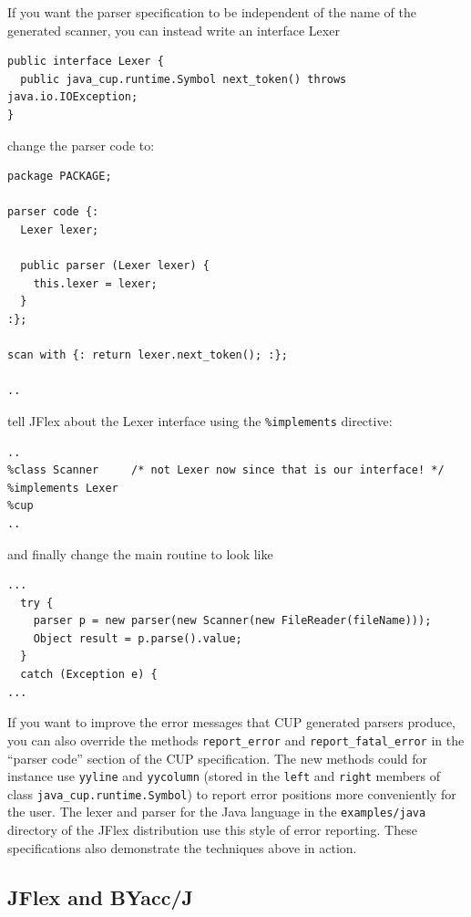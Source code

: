 \documentclass[11pt]{scrartcl}
\newcommand{\xsmall}{}
\begin{document}
If you want the parser specification to be independent of the name of the generated
scanner, you can instead write an interface Lexer

{\xsmall\begin{verbatim}
public interface Lexer {
  public java_cup.runtime.Symbol next_token() throws java.io.IOException;
}
\end{verbatim}
}

change the parser code to:

{\xsmall\begin{verbatim}
package PACKAGE;

parser code {:
  Lexer lexer;

  public parser (Lexer lexer) {
    this.lexer = lexer;
  }
:};

scan with {: return lexer.next_token(); :};

..
\end{verbatim}
}

tell JFlex about the Lexer 
interface using the \texttt{\%implements}
directive:

{\xsmall\begin{verbatim}
..
%class Scanner     /* not Lexer now since that is our interface! */
%implements Lexer
%cup
..
\end{verbatim}
}

and finally change the main routine to look like

{\xsmall\begin{verbatim}
...
  try {
    parser p = new parser(new Scanner(new FileReader(fileName)));
    Object result = p.parse().value;
  }
  catch (Exception e) {
...
\end{verbatim}
}

If you want to improve the error messages that CUP generated parsers
produce, you can also override the methods \texttt{report\_error} and \texttt{report\_fatal\_error}
in the ``parser code'' section of the CUP specification. The new methods
could for instance use \texttt{yyline} and \texttt{yycolumn} (stored in
the \texttt{left} and \texttt{right} members of class \texttt{java\_cup.runtime.Symbol})
to report error positions more conveniently for the user. The lexer and
parser for the Java language in the \texttt{examples/java} directory of the
JFlex distribution use this style of error reporting. These specifications
also demonstrate the techniques above in action.

\subsection{JFlex and BYacc/J\label{YaccWork}}
\end{document}
